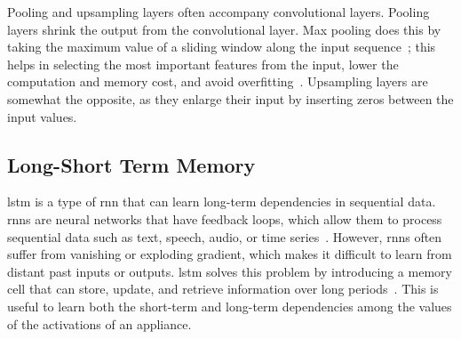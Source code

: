 \newpage

Pooling and upsampling layers often accompany convolutional layers. Pooling layers shrink the output from the convolutional layer. Max pooling does this by taking the maximum value of a sliding window along the input sequence~\parencite{ahmadDeepLearningMultiscale2019}; this helps in selecting the most important features from the input, lower the computation and memory cost, and avoid overfitting~\parencite{zhangDiveDeepLearning2023,masciStackedConvolutionalAutoEncoders2011}. Upsampling layers are somewhat the opposite, as they enlarge their input by inserting zeros between the input values.

\subsection{Long-Short Term Memory}

\acrfull{lstm} is a type of \acrfull{rnn} that can learn long-term dependencies in sequential data. \acrshort{rnn}s are neural networks that have feedback loops, which allow them to process sequential data such as text, speech, audio, or time series~\parencite{ahmadDeepLearningMultiscale2019}. However, \acrshort{rnn}s often suffer from vanishing or exploding gradient, which makes it difficult to learn from distant past inputs or outputs. \acrshort{lstm} solves this problem by introducing a memory cell that can store, update, and retrieve information over long periods~\parencite{hochreiterLongShortTermMemory1997}. This is useful to learn both the short-term and long-term dependencies among the values of the activations of an appliance.

